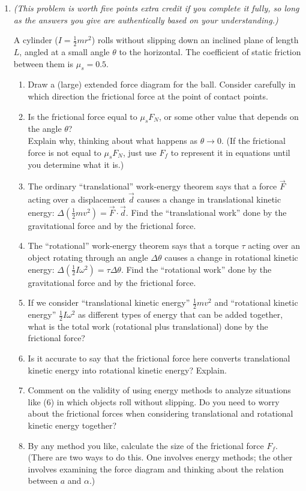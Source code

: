 \documentclass[12pt]{article}
\begin{document}
\begin{enumerate}
\item {\it (This problem is worth five points extra credit if you complete it fully, so long as the answers you give are authentically based on your understanding.)}

A cylinder ($I=\frac{1}{2} mr^2$) rolls without slipping down an inclined plane of length $L$, angled at a small angle $\theta$ to the horizontal. The
coefficient of static friction between them is $\mu_s=0.5$.

\begin{enumerate}
	
	\item Draw a (large) extended force diagram for the ball. Consider carefully in which direction the frictional force at the point of contact points.
	\item Is the frictional force equal to $\mu_s F_N$, or some other value that depends on the angle $\theta$? \\ Explain why, thinking about what happens as $\theta \rightarrow 0$.
	(If the frictional force is not equal to $\mu_s F_N$, just use $F_f$ to represent it in equations until you determine what it is.)
	\item The ordinary ``translational'' work-energy theorem says that a force $\vec F$ acting over a displacement $\vec d$ causes a change in translational kinetic energy:
	$\Delta (\frac{1}{2}mv^2) = \vec F \cdot \vec d$.
	Find the ``translational work'' done by the gravitational force and by the frictional force.
	\item The ``rotational'' work-energy theorem says that a torque $\tau $ acting over an object rotating through an angle $\Delta \theta$ causes a change in rotational kinetic energy: $\Delta (\frac{1}{2}I\omega^2) = \tau \Delta \theta$.
	Find the ``rotational work'' done by the gravitational force and by the frictional force.
	\item If we consider ``translational kinetic energy'' $\frac{1}{2}mv^2$ and ``rotational kinetic energy'' $\frac{1}{2}I\omega^2$ as different types of energy that can be added together, what is the total
	work (rotational plus translational) done by the frictional force?
	\item Is it accurate to say that the frictional force here converts translational kinetic energy into rotational kinetic energy? Explain.
	\item Comment on the validity of using energy methods to analyze situations like (6) in which objects roll without slipping. Do you need to worry about the frictional forces when considering translational and rotational kinetic energy together?
	\item By any method you like, calculate the size of the frictional force $F_f$. (There are two ways to do this. One involves energy methods; the other involves
	examining the force diagram and thinking about the relation between $a$ and $\alpha$.)
\end{enumerate}
 


\end{enumerate}
\end{document}
